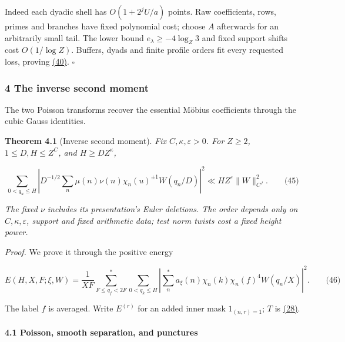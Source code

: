 Indeed each dyadic shell has \(O(1+2^jU/a)\) points. Raw coefficients, rows, primes and branches have fixed polynomial cost; choose \(A\) afterwards for an arbitrarily small tail. The lower bound \(e_\lambda\ge-4\log_Z3\) and fixed support shifts cost \(O(1/\log Z)\). Buffers, dyads and finite profile orders fit every requested loss, proving \protect\hyperlink{cf:eq:4.6}{(40)}. \(\square\)

\hypertarget{cf:sec:C}{}

\label{cf:sec:C}

\hypertarget{the-inverse-second-moment}{%
\subsubsection{4 The inverse second moment}\label{the-inverse-second-moment}}

The two Poisson transforms recover the essential Möbius coefficients through the cubic Gauss identities.

\textbf{Theorem 4.1} (Inverse second moment). \emph{\hypertarget{cf:inverse-moment}{}\label{cf:inverse-moment} Fix \(C,\kappa,\varepsilon>0\). For \(Z\ge2\), \(1\le D,H\le Z^C\), and \(H\ge DZ^\kappa\), \hypertarget{cf:eq:C.1}{}\label{cf:eq:C.1}}

\[
\sum_{0<q_u\le H}\left|D^{-1/2}
\sum_n\mu(n)\nu(n)\chi_n(u)^{\pm1}W(q_n/D)\right|^2
\ll HZ^\varepsilon\|W\|_{C^J}^2.
\qquad\text{(45)}
\]

\emph{The fixed \(\nu\) includes its presentation's Euler deletions. The order depends only on \(C,\kappa,\varepsilon\), support and fixed arithmetic data; test norm twists cost a fixed height power.}

\emph{Proof.} We prove it through the positive energy

\hypertarget{cf:eq:C.2}{}

\label{cf:eq:C.2}

\[
E(H,X,F;\xi,W)=\frac1{XF}
\sum_{F\le q_f<2F}^{*}\sum_{0<q_k\le H}
\left|\sum_n^{*}a_\xi(n)\chi_n(k)\chi_n(f)^4W(q_n/X)\right|^2.
\qquad\text{(46)}
\]

The label \(f\) is averaged. Write \(E^{(r)}\) for an added inner mask \(1_{(n,r)=1}\); \(T\) is \protect\hyperlink{cf:eq:B.12}{(28)}.

\hypertarget{cf:sec:C.1}{}

\label{cf:sec:C.1}

\hypertarget{poisson-smooth-separation-and-punctures}{%
\paragraph{4.1 Poisson, smooth separation, and punctures}\label{poisson-smooth-separation-and-punctures}}

